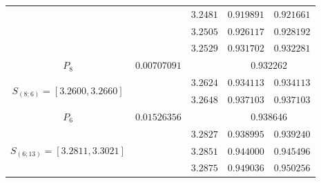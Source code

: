 \documentclass[10pt]{amsart}
\numberwithin{equation}{section}
\theoremstyle{definition}
\newcommand\intpx[2]{S_{(#1;#2)}}
\begin{document}
\begin{longtable}{|c|c|c|c|c|}
  &  &  $3.2481 $  &  $ 0.919891 $ & $ 0.921661 $ \\
  &  &  $3.2505 $  &  $ 0.926117 $ & $ 0.928192 $ \\
  &  &  $3.2529 $  &  $ 0.931702 $ & $ 0.932281 $ \\
   \hline
      $P_{8}$  &  $0.00707091$ &  & \multicolumn{2}{c|}{0.932262}  \\
   \hline
   \multirow{2}{*}{ $ \intpx{8}{6}  =  [3.2600,3.2660] $ } 
  &  &  $3.2624 $  &  $ 0.934113 $ & $ 0.934113 $ \\
  &  &  $3.2648 $  &  $ 0.937103 $ & $ 0.937103 $ \\
   \hline
   $P_{6}$ &  $0.01526356 $ &  & \multicolumn{2}{c|}{0.938646} \\
 \hline
   \multirow{9}{*}{ $ \intpx{6}{13} =  [3.2811,3.3021] $ }
  &  &  $3.2827 $  &  $ 0.938995 $ & $ 0.939240 $ \\
  &  &  $3.2851 $  &  $ 0.944000 $ & $ 0.945496 $ \\
  &  &  $3.2875 $  &  $ 0.949036 $ & $ 0.950256 $ \\

\end{longtable}
\end{document}

